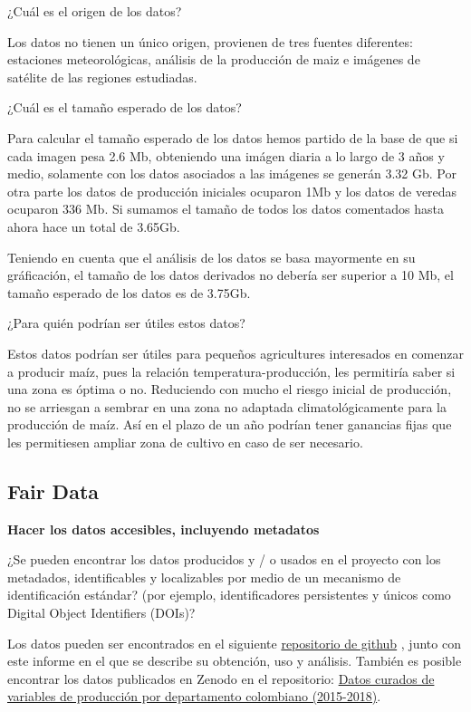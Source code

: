\documentclass[12pt, spanish]{article}
\begin{document}
\begin{shaded}
¿Cuál es el origen de los datos?
\end{shaded}
Los datos no tienen un único origen, provienen de tres fuentes diferentes: estaciones meteorológicas, análisis de la producción de maiz e imágenes de satélite de las regiones estudiadas.

\begin{shaded}
¿Cuál es el tamaño esperado de los datos?
\end{shaded}

Para calcular el tamaño esperado de los datos hemos partido de la base de que si cada imagen pesa 2.6 Mb, obteniendo una imágen diaria a lo largo de 3 años y medio, solamente con los datos asociados a las imágenes se generán 3.32 Gb. Por otra parte los datos de producción iniciales ocuparon 1Mb y los datos de veredas ocuparon 336 Mb. Si sumamos el tamaño de todos los datos comentados hasta ahora hace un total de 3.65Gb.

Teniendo en cuenta que el análisis de los datos se basa mayormente en su gráficación, el tamaño de los datos derivados no debería ser superior a 10 Mb, el tamaño esperado de los datos es de 3.75Gb.

\begin{shaded}
¿Para quién podrían ser útiles estos datos?
\end{shaded}
Estos datos podrían ser útiles para pequeños agricultures interesados en comenzar a producir maíz, pues la relación temperatura-producción, les permitiría saber si una zona es óptima o no. Reduciendo con mucho el riesgo inicial de producción, no se arriesgan a sembrar en una zona no adaptada climatológicamente para la producción de maíz. Así en el plazo de un año podrían tener ganancias fijas que les permitiesen ampliar zona de cultivo en caso de ser necesario.

\subsection{Fair Data}





\textbf{Hacer los datos accesibles, incluyendo metadatos}

\begin{shaded}
¿Se pueden encontrar los datos producidos y / o usados en el proyecto con los metadados, identificables y localizables por medio de un mecanismo  de identificación estándar? (por ejemplo, identificadores persistentes y únicos como Digital Object Identifiers (DOIs)?
\end{shaded}
Los datos pueden ser encontrados en el siguiente \href{{https://github.com/javialonsaso/maiz_CO}}{repositorio de github} , junto con este informe en el que se describe su obtención, uso y análisis. También es posible encontrar los datos publicados en Zenodo en el repositorio: \href{{10.5281/zenodo.3611494}}{Datos curados de variables de producción por departamento colombiano (2015-2018)}.
\end{document}
